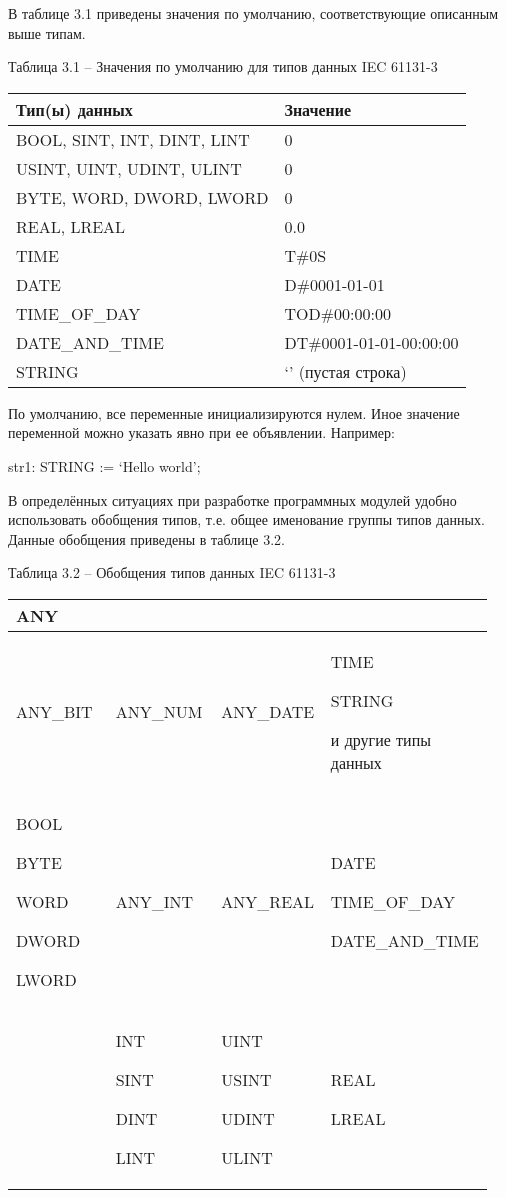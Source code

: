 \documentclass[letterpaper,10pt,russian]{sphinxmanual}
\begin{document}
В таблице 3.1 приведены значения по умолчанию, соответствующие описанным
выше типам.

Таблица 3.1 – Значения по умолчанию для типов данных IEC 61131-3

\noindent\begin{tabulary}{\linewidth}{|L|L|}
\hline

Тип(ы) данных
&
Значение
\\
\hline
BOOL, SINT, INT, DINT, LINT
&
0
\\
\hline
USINT, UINT, UDINT, ULINT
&
0
\\
\hline
BYTE, WORD, DWORD, LWORD
&
0
\\
\hline
REAL, LREAL
&
0.0
\\
\hline
TIME
&
T\#0S
\\
\hline
DATE
&
D\#0001-01-01
\\
\hline
TIME\_OF\_DAY
&
TOD\#00:00:00
\\
\hline
DATE\_AND\_TIME
&
DT\#0001-01-01-00:00:00
\\
\hline
STRING
&
‘’ (пустая строка)
\\
\hline\end{tabulary}


По умолчанию, все переменные инициализируются нулем. Иное значение
переменной можно указать явно при ее объявлении. Например:

str1: STRING := ‘Hello world’;

В определённых ситуациях при разработке программных модулей удобно
использовать обобщения типов, т.е. общее именование группы типов данных.
Данные обобщения приведены в таблице 3.2.

Таблица 3.2 – Обобщения типов данных IEC 61131-3

\noindent\begin{tabular}{|p{0.237\linewidth}|p{0.237\linewidth}|p{0.237\linewidth}|p{0.237\linewidth}|}
\hline

ANY
&\multicolumn{3}{l|}{\relax \unskip}\relax \\
\hline
ANY\_BIT
&
ANY\_NUM
&
ANY\_DATE
&
TIME

STRING

и другие типы данных
\\
\hline
BOOL

BYTE

WORD

DWORD

LWORD
&
ANY\_INT
&
ANY\_REAL
&
DATE

TIME\_OF\_DAY

DATE\_AND\_TIME
\\
\hline&
INT

SINT

DINT

LINT
&
UINT

USINT

UDINT

ULINT
&
REAL

LREAL
\\
\hline\end{tabular}
\end{document}
